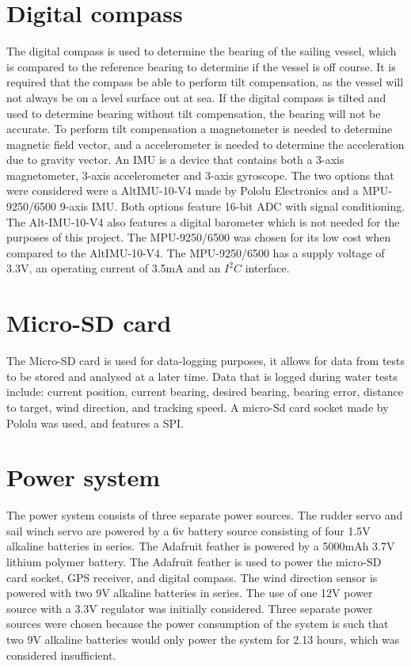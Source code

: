 \section{Digital compass}
The digital compass is used to determine the bearing of the sailing vessel, which is compared to the reference bearing to determine if the vessel is off course. It is 
required that the compass be able to perform tilt compensation, as the vessel will not always be on a level surface out at sea. If the digital compass is tilted and used
to determine bearing without tilt compensation, the bearing will not be accurate. To perform tilt compensation a magnetometer is needed to determine magnetic field vector, and a 
accelerometer is needed to determine the acceleration due to gravity vector. An IMU is a device that contains both a 3-axis magnetometer, 3-axis accelerometer and 3-axis gyroscope.
The two options that were considered were a AltIMU-10-V4\cite{altimu-10} made by Pololu Electronics and a MPU-9250/6500 9-axis IMU\cite{mpu-9250}. Both options feature 
16-bit ADC with signal conditioning. The 
Alt-IMU-10-V4 also features a digital barometer which is not needed for the purposes of this project. The MPU-9250/6500 was chosen for its low cost when compared 
to the AltIMU-10-V4. The MPU-9250/6500 has a supply voltage of 3.3V, an operating current of 3.5mA and an $I^{2}C$ interface.


\section{Micro-SD card}
The Micro-SD card is used for data-logging purposes, it allows for data from tests to be stored and analysed at a later time. Data that is logged during water tests 
include: current position, current bearing, desired bearing, bearing error, distance to target, wind direction, and tracking speed. A micro-Sd card socket made 
by Pololu\cite{sd} was used, and features a SPI.  


\section{Power system}
The power system consists of three separate power sources. The rudder servo and sail winch servo are powered by a 6v battery source consisting of four 1.5V
alkaline batteries in series. The Adafruit feather is powered by a 5000mAh 3.7V lithium polymer battery. The Adafruit feather is used to power the micro-SD 
card socket, GPS receiver, and digital compass. The wind direction sensor is powered with two 9V alkaline batteries in series. The use of one 12V power source 
with a 3.3V regulator was initially considered. Three separate power sources were chosen because the power consumption of the system is such that two 9V alkaline
batteries would only power the system for 2.13 hours, which was considered insufficient.

